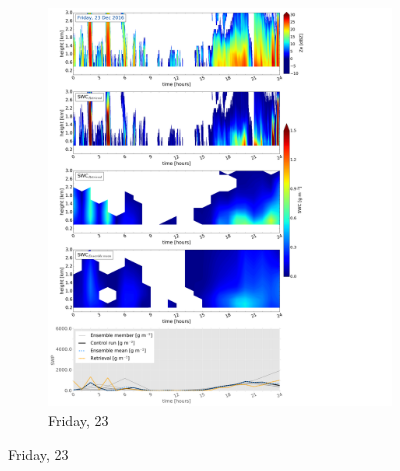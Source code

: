 \begin{figure}\ContinuedFloat
	\centering
	\begin{subfigure}[b]{0.8\textwidth}
		\includegraphics[trim={0.5cm 0.5cm 17.5cm .5cm},clip,width=\textwidth]{./fig_SWC/20161223}
		\caption{Friday, \SI{23}{\dec}}\label{fig:SWC23}
	\end{subfigure}
\end{figure}
